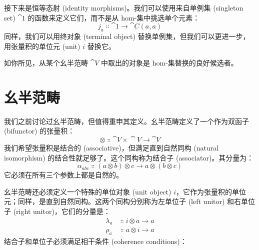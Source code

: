 接下来是恒等态射 (identity morphisms)。我们可以使用来自单例集 (singleton set) $\cat{1}$ 的函数来定义它们，而不是从 hom-集中挑选单个元素：
\[j_a \Colon \cat{1} \to \cat{C}(a, a)\]
同样，我们可以用终对象 (terminal object) 替换单例集，但我们可以更进一步，用张量积的单位元 (unit) $i$ 替换它。

如你所见，从某个幺半范畴 $\cat{V}$ 中取出的对象是 hom-集替换的良好候选者。

\section{幺半范畴}

我们之前讨论过幺半范畴，但值得重申其定义。幺半范畴定义了一个作为双函子 (bifunctor) 的张量积：
\[\otimes \Colon \cat{V}\times{}\cat{V} \to \cat{V}\]
我们希望张量积是结合的 (associative)，但满足直到自然同构 (natural isomorphism) 的结合性就足够了。这个同构称为结合子 (associator)。其分量为：
\[\alpha_{a b c} \Colon (a \otimes b) \otimes c \to a \otimes (b \otimes c)\]
它必须在所有三个参数上都是自然的。

幺半范畴还必须定义一个特殊的单位对象 (unit object) $i$，它作为张量积的单位元；同样，是直到自然同构。这两个同构分别称为左单位子 (left unitor) 和右单位子 (right unitor)，它们的分量是：
\begin{align*}
  \lambda_a & \Colon i \otimes a \to a \\
  \rho_a    & \Colon a \otimes i \to a
\end{align*}
结合子和单位子必须满足相干条件 (coherence conditions)：

\begin{figure}[H]
  \centering
\end{figure}

\begin{figure}[H]
  \centering
\end{figure}


